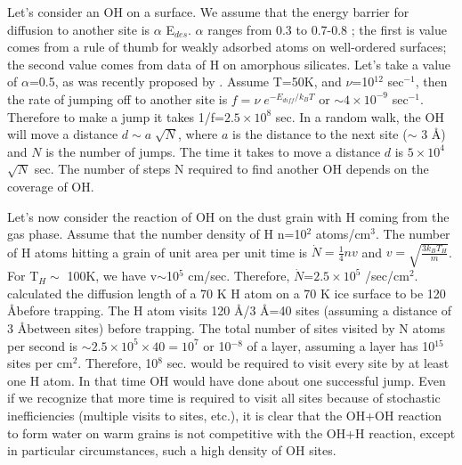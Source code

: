 \documentclass[iop]{emulateapj}
\begin{document}
Let's consider an OH on a surface. We assume \citep{He2014} that the energy barrier for diffusion to another site is $\alpha$ E$_{des}$. $\alpha$ ranges from 0.3 \citep{Bruch2007} to 0.7-0.8 \citep{Katz1999,Perets2007}; the first is value comes from a rule of thumb for weakly adsorbed atoms on well-ordered surfaces; the second value comes from data of H on amorphous silicates. Let's take a value of $\alpha$=0.5, as was recently proposed by \citet{Yildiz2013}. Assume T=50K, and $\nu$=10$^{12}$ sec$^{-1}$, then the rate of jumping off to another site is $f=\nu \;e^{-E_{diff}/k_BT}$ or $\sim 4\times10^{-9}$ sec$^{-1}$. Therefore to make a jump it takes 1/f=$2.5\times10^8$ sec. In a random walk, the OH will move a distance $ d \sim a \;\sqrt{N}$, where $a$ is the distance to the next site ($\sim$ 3 \AA) and $N$ is the number of jumps. The time it takes to move a distance $d$ is $5\times10^4$ $\sqrt{N}$ sec. The number of steps N required to find another OH depends on the coverage of OH. 

Let's now consider the reaction of OH on the dust grain with H coming from the gas phase. Assume that the number density of H n=10$^2$ atoms/cm$^3$. The number of H atoms hitting a grain of unit area per unit time is $\dot{N}=\frac{1}{4}nv$ and $v=\sqrt{\frac{3k_BT_H}m}$. For T$_H\sim$ 100K, we have v$\sim$10$^5$ cm/sec. Therefore, $\dot{N}$=$2.5\times10^5$ /sec/cm$^2$. 
\citet{Takahashi1999} calculated the diffusion length of a 70 K H atom on a 70 K ice surface to be 120 \AA before trapping. The H atom  visits 120 \AA/3 \AA=40 sites (assuming a distance of 3 \AA between sites) before trapping. The total number of sites visited by N atoms per second is $\sim 2.5\times10^{5}\times 40=10^7$ or 10$^{-8}$ of a layer, assuming a layer has 10$^{15}$ sites per cm$^2$. Therefore, 10$^{8}$ sec. would be required to visit every site by at least one H atom. In that time OH would have done about one successful jump. Even if we recognize that more time is required to visit all sites because of stochastic inefficiencies (multiple visits to sites, etc.), it is clear that  the OH+OH reaction to form water on warm grains is not competitive with the OH+H reaction, except in particular circumstances, such a high density of OH sites.
\end{document}
